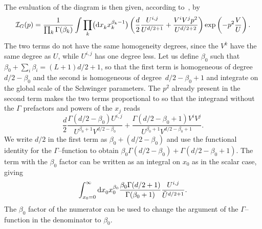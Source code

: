 \documentclass[11pt]{article}
\numberwithin{equation}{section}
\def\cI{{\mathcal I}}
\begin{document}
The evaluation of the diagram is then given, according to~\cite{Na71}, by
\[%
	\cI_G(p) = \frac {1}{ \prod_k \Gamma(\beta_k)} \int \prod_k \bigl( {\rm d}x_k^{\vphantom {\beta_k}} x_k^{\beta_k-1}\bigr)
 		\left(\frac d2 \frac{U^{i,j}}{U^{d/2+1}} + \frac{V^i V^j p^2}{U^{d/2+2}} \right) \exp\left(-p^2 \frac V U\right).
\]
The two terms do not have the same homogeneity degrees, since the $V^k$ have the same degree as $U$, while $U^{i,j}$ has one degree less.
Let us define $\beta_0$ such that $\beta_0 + \sum_i \beta_i = (L+1)d/2 +1$, so that the first term is homogeneous of degree $d/2 - \beta_0$
and the second is homogeneous of degree~${d/2 - \beta_0 +1}$ and integrate on the global scale of the Schwinger parameters. The $p^2$ already present in the second term makes the two terms proportional to  so that the integrand without the $\Gamma$ prefactors and powers of the $x_j$ reads
\[%
 		\frac {d}2 \frac {\Gamma(d/2-\beta_0) U^{i,j}}{U^{\beta_0+1}V^{d/2-\beta_0}} + \frac{ \Gamma(d/2-\beta_0+1)V^i V^j}{U^{\beta_0+1}V^{d/2-\beta_0+1}} .
\]
We write $d/2$ in the first term as $\beta_0 + (d/2 - \beta_0)$ and use the functional identity for the $\Gamma$--function to obtain $\beta_0 \Gamma(d/2 - \beta_0) + \Gamma(d/2 - \beta_0 +1)$. The term with the $\beta_0$ factor can be written as an integral on $x_0$ as in the scalar case, giving
\begin{equation} \label{beta+1}
	\int_{x_0 =0}^\infty {\rm d}x_0 ^{\vphantom{\beta_0}} x_0 ^{\beta_0} \frac { \beta_0 \Gamma(d/2 + 1) }{\Gamma(\beta_0+1) } \frac { U^{i,j} } { \tilde U ^{d/2 +1} }.
\end{equation}
The $\beta_0$ factor of the numerator can be used to change the argument of the $\Gamma$--function in the denominator to $\beta_0$.
\end{document}
